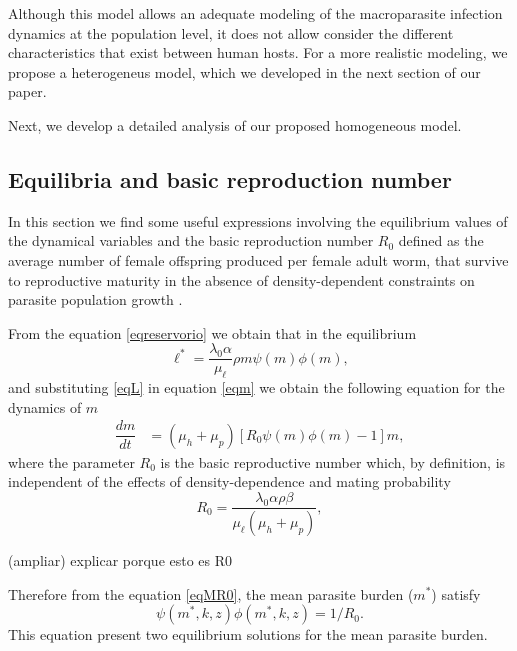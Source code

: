 \documentclass[eng]{MMSB-class-eng}
\begin{document}
{Although this model allows an adequate modeling of the macroparasite infection dynamics at the population level, it does not allow consider the different characteristics that exist between human hosts.
For a more realistic modeling, we propose a heterogeneus model, which we developed in the next section of our paper.

Next, we develop a detailed analysis of our proposed homogeneous model.


\subsection{Equilibria and basic reproduction number}

{\color{red}
In this section we find some useful expressions involving the equilibrium values of the dynamical variables and the basic reproduction number $R_0$ defined as 
the average number of female offspring produced per female adult worm, that survive to reproductive maturity in the
absence of density-dependent constraints on parasite population growth \citep{anderson1992infectious}.



From the equation \eqref{eqreservorio} we obtain that in the equilibrium
\begin{equation}\label{eqL}
\ell^*=\frac{ \lambda_0 \alpha}{\mu_{\ell}} \rho  m \psi(m)\phi(m), 
\end{equation} 
and substituting \eqref{eqL} in equation \eqref{eqm} we obtain the following equation for the dynamics of $m$
\begin{align}\label{eqMR0}
\dfrac{dm}{dt}&=(\mu_h + \mu_p)\left[ R_0  \psi(m)\phi(m) -1 \right] m,%
\end{align}
where the parameter $R_0$ is the basic reproductive number which, by definition, is independent of the effects of density-dependence and  mating probability
\color{blue}
\begin{equation}\label{valorR0}
R_0=\frac{ \lambda_0 \alpha  \rho \beta }{\mu_{\ell} (\mu_h + \mu_p) },
\end{equation}
}

{\color{green}(ampliar) explicar porque esto es R0}

Therefore from the equation \eqref{eqMR0}, the mean parasite burden ($m^*$) satisfy
\begin{equation}\label{eqequilibrio}
\psi(m^*,k,z)\phi(m^*,k,z)=1/R_0.
\end{equation}
This equation present two  equilibrium solutions for the mean parasite burden. 

}
\end{document}
